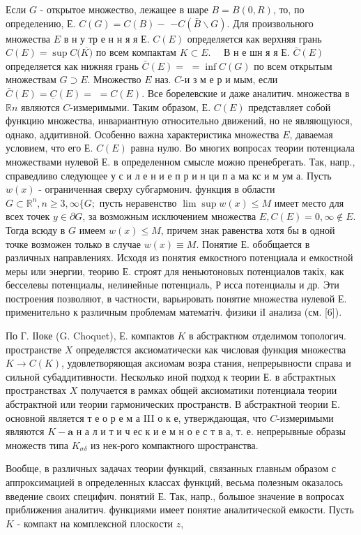 \documentclass[10pt]{article}
\begin{document}
Если $G$ - открытое множество, лежащее в шаре $B=B(0, R)$, то, по определению, Е. $C(G)=C(B)-$ $-C(\bar{B} \backslash G)$. Для произвольного множества $E$ в н у тр е н н я я Е. $C(E)$ определяется как верхняя грань $C(E)=\sup C(\overline{K)}$ по всем компактам $K \subset E . \quad$ В н е шн я я Е. $\bar{C}(E)$ определяется как нижняя грань $\bar{C}(E)=$ $=\inf C(G)$ по всем открытым множествам $G \supset E$. Множество $E$ наз. $C$-и з м е р и мым, если $\bar{C}(E)=\underline{C}(E)=$ $=C(E)$. Все борелевские и даже аналитич. множества в $\mathbb{R} n$ являются $C$-измеримыми. Таким образом, Е. $C(E)$ представляет собой функцию множества, инвариантную относительно движений, но не являющуюся, однако, аддитивной. Особенно важна характеристика множества $E$, даваемая условием, что его Е. $C(E)$ равна нулю. Во многих вопросах теории потенциала множествами нулевой Е. в определенном смысле можно пренебрегать. Так, напр., справедливо следующее у с и л е н и е п р и н ци п а ма кс и м ум а. Пусть $w(x)$ - ограниченная сверху субгармонич. функция в области $G \subset \mathbb{R}^{n}, n \geqslant 3, \infty\{G ;$ пусть неравенство $\lim \sup w(x) \leqslant M$ имеет место для всех точек $y \in \partial G$, за возможным исключением множества $E, C(E)=0, \infty \notin E$. Тогда всюду в $G$ имеем $w(x) \leqslant M$, причем знак равенства хотя бы в одной точке возможен только в случае $w(x) \equiv M$. Понятие Е. обобщается в различных направлениях. Исходя из понятия емкостного потенциала и емкостной меры или энергии, теорию Е. строят для неньютоновых потенциалов такіх, как бесселевы потенциалы, нелинейные потенциаль, Р исса потенциалы и др. Эти построения позволяют, в частности, варьировать понятие множества нулевой Е. применительно к различным проблемам математіч. физики іІ анализа (см. [6]).



По Г. ІІоке (G. Choquet), Е. компактов $K$ в абстрактном отделимом топологич. пространстве $X$ определястся аксиоматически как числовая функция множества $K \rightarrow C(K)$, удовлетворяющая аксиомам возра стания, непрерывности справа и сильной субаддитивности. Несколько иной подход к теории Е. в абстрактных пространствах $X$ получается в рамках общей аксиоматики потенциала теории абстрактной или теории гармонических пространств. В абстрактной теории Е. основной является т е о р е м а III о к е, утверждающая, что $C$-измеримыми являются $K-\mathbf{a}$ н а л и т и ч ес к и е м н о е с т в а, т. е. непрерывные образы множеств типа $K_{\sigma \delta}$ из нек-рого компактного шространства.



Вообще, в различных задачах теории функций, связанных главным образом с аппроксимацией в определенных классах функций, весьма полезным оказалось введение своих специфич. понятий Е. Так, напр., большое значение в вопросах приближения аналитич. функциями имеет понятие аналитической емкости. Пусть $K$ - компакт на комплексной плоскости $z$,
\end{document}
